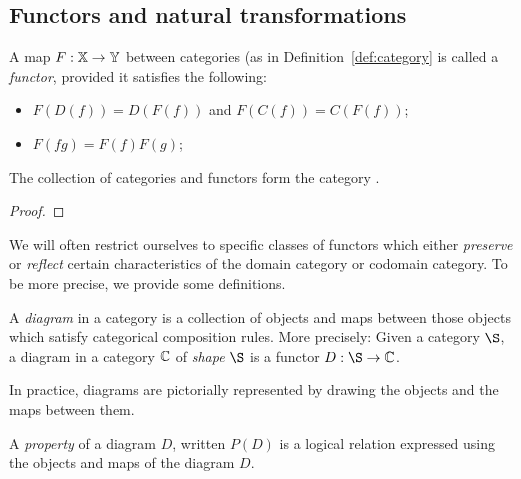 \subsection{Functors and natural transformations} %
\label{ssub:functors_and_natural_transformations}

\begin{definition}\label{def:functor}
  A map $F:\mathbb{X} \to \mathbb{Y}$ between categories (as in Definition~\ref{def:category} is called a
  \emph{functor}, provided it satisfies the following:
  \begin{itemize}
    \item[\axiom{F}{1}] $F(D(f)) = D(F(f))$ and $F(C(f)) = C(F(f))$;
    \item[\axiom{F}{2}] $F(f g) = F(f)F(g)$;
  \end{itemize}
\end{definition}

\begin{lemma}\label{lem:cat_is_a_category}
  The collection of categories and functors form the category \cat.
\end{lemma}
\begin{proof}
\end{proof}

We will often restrict ourselves to specific classes of functors which either \emph{preserve} or
\emph{reflect} certain characteristics of the domain category or codomain category. To be more
precise, we provide some definitions.

\begin{definition}\label{def:diagram_in_a_category}
  A \emph{diagram} in a category is a collection of objects and maps between those objects
  which satisfy categorical composition rules. More precisely: Given a category $\S$, a diagram
  in a category $\mathbb{C}$ of \emph{shape} $\S$ is a functor $D:\S \to \C$.
\end{definition}

In practice, diagrams are pictorially represented by drawing the objects and the maps between them.

\begin{definition}\label{def:property_of_a_diagram}
  A \emph{property} of a diagram $D$, written $P(D)$ is a logical relation expressed using the
  objects and maps of the diagram $D$.
\end{definition}

